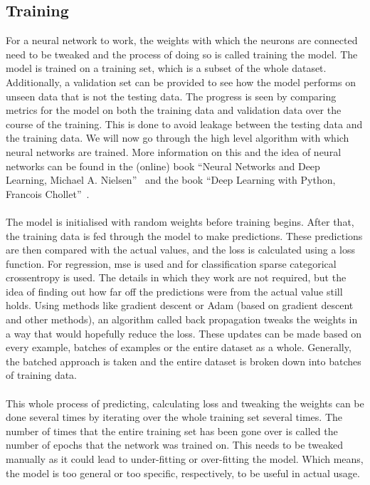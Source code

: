 \documentclass[12pt]{article}
\begin{document}
\subsection{Training}\label{subsec:training}
For a neural network to work, the weights with which the neurons are connected need to be tweaked and the process of doing so is called training the model. The model is trained on a training set, which is a subset of the whole dataset. Additionally, a validation set can be provided to see how the model performs on unseen data that is not the testing data. The progress is seen by comparing metrics for the model on both the training data and validation data over the course of the training. This is done to avoid leakage between the testing data and the training data. We will now go through the high level algorithm with which neural networks are trained. More information on this and the idea of neural networks can be found in the (online) book ``Neural Networks and Deep Learning, Michael A. Nielsen''~\cite{neuralnets} and the book ``Deep Learning with Python, Francois Chollet''~\cite{deeplearning}.
\\\\
The model is initialised with random weights before training begins. After that, the training data is fed through the model to make predictions. These predictions are then compared with the actual values, and the loss is calculated using a loss function. For regression, mse is used and for classification sparse categorical crossentropy is used. The details in which they work are not required, but the idea of finding out how far off the predictions were from the actual value still holds. Using methods like gradient descent or Adam (based on gradient descent and other methods), an algorithm called back propagation tweaks the weights in a way that would hopefully reduce the loss. These updates can be made based on every example, batches of examples or the entire dataset as a whole. Generally, the batched approach is taken and the entire dataset is broken down into batches of training data. 
\\\\
This whole process of predicting, calculating loss and tweaking the weights can be done several times by iterating over the whole training set several times. The number of times that the entire training set has been gone over is called the number of epochs that the network was trained on. This needs to be tweaked manually as it could lead to under-fitting or over-fitting the model. Which means, the model is too general or too specific, respectively, to be useful in actual usage.
\end{document}

